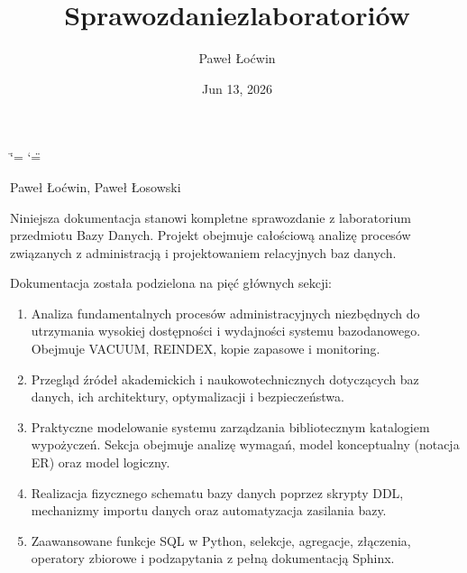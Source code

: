 \documentclass[letterpaper,10pt,english]{sphinxmanual}
\title{Sprawozdanie\sphinxhyphen{}z\sphinxhyphen{}laboratoriów}
\date{Jun 13, 2026}
\author{Paweł Łoćwin}
\begin{document}
\ifdefined\shorthandoff
  \ifnum\catcode`\=\string=\active\shorthandoff{=}\fi
  \ifnum\catcode`\"=\active{}\fi
\fi

\pagestyle{empty}
\sphinxmaketitle
\pagestyle{plain}
\sphinxtableofcontents
\pagestyle{normal}
\label{\detokenize{index::doc}}


\sphinxAtStartPar
{} Paweł Łoćwin, Paweł Łosowski

\sphinxAtStartPar
{}

\sphinxAtStartPar
Niniejsza dokumentacja stanowi kompletne sprawozdanie z laboratorium przedmiotu Bazy Danych. Projekt obejmuje całościową analizę procesów związanych z administracją i projektowaniem relacyjnych baz danych.

\sphinxAtStartPar
Dokumentacja została podzielona na pięć głównych sekcji:
\begin{enumerate}
%
\item {} 
\sphinxAtStartPar
{} \textendash{} Analiza fundamentalnych procesów administracyjnych niezbędnych do utrzymania wysokiej dostępności i wydajności systemu bazodanowego. Obejmuje VACUUM, REINDEX, kopie zapasowe i monitoring.

\item {} 
\sphinxAtStartPar
{} \textendash{} Przegląd źródeł akademickich i naukowo\sphinxhyphen{}technicznych dotyczących baz danych, ich architektury, optymalizacji i bezpieczeństwa.

\item {} 
\sphinxAtStartPar
{} \textendash{} Praktyczne modelowanie systemu zarządzania bibliotecznym katalogiem wypożyczeń. Sekcja obejmuje analizę wymagań, model konceptualny (notacja E\sphinxhyphen{}R) oraz model logiczny.

\item {} 
\sphinxAtStartPar
{} \textendash{} Realizacja fizycznego schematu bazy danych poprzez skrypty DDL, mechanizmy importu danych oraz automatyzacja zasilania bazy.

\item {} 
\sphinxAtStartPar
{} \textendash{} Zaawansowane funkcje SQL w Python, selekcje, agregacje, złączenia, operatory zbiorowe i podzapytania z pełną dokumentacją Sphinx.

\end{enumerate}
\end{document}
